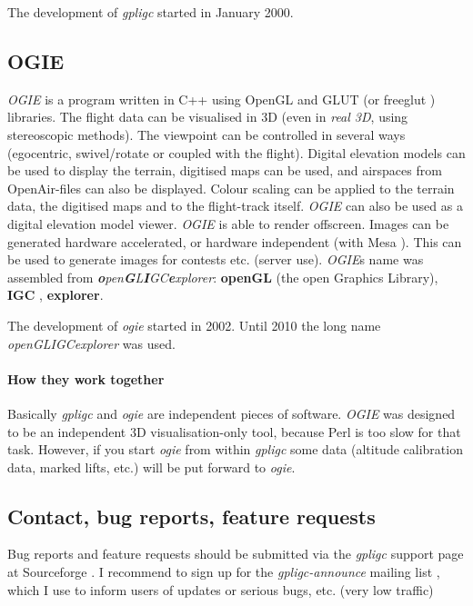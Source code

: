 The development of \emph{gpligc} started in January 2000.


\subsection{OGIE}
\emph{OGIE} is a  program written in C++ using OpenGL and GLUT (or freeglut \cite{freeglut}) libraries.
The flight data can be visualised in 3D (even in \emph{real 3D}, using stereoscopic methods).
The viewpoint can be controlled in several  ways (egocentric, swivel/rotate or coupled with the flight).
Digital elevation models can be used to display the terrain, digitised maps can be used, and airspaces from OpenAir\texttrademark-files can also be displayed.
Colour scaling can be applied to the terrain data, the digitised maps and to the flight-track itself.
\emph{OGIE} can also be used as a digital elevation model viewer.
\emph{OGIE} is able to render offscreen. Images can be generated hardware accelerated, or hardware independent (with Mesa \cite{mesa}). This can be used to generate images for contests etc. (server use).
\emph{OGIE}s name was assembled from \emph{\textbf{o}pen\textbf{G}L\textbf{I}GC\textbf{e}xplorer}: \textbf{openGL} (the open Graphics Library), \textbf{IGC} \cite{igc}, \textbf{explorer}.


The development of \emph{ogie} started in 2002. Until 2010 the long name \emph{openGLIGCexplorer} was used.


\paragraph{How they work together}
Basically \emph{gpligc} and \emph{ogie} are independent pieces of software.
\emph{OGIE} was designed to be an independent 3D visualisation-only tool, because Perl is too slow for that task.
However, if you start \emph{ogie} from within \emph{gpligc} some data (altitude calibration data, marked lifts, etc.) will be put forward to \emph{ogie}.

\subsection{Contact, bug reports, feature requests}
Bug reports and feature requests should be submitted via the \emph{gpligc} support page at Sourceforge \cite{gpligc}.
I recommend to sign up for the \emph{gpligc-announce} mailing list \cite{gpligc}, which I use to inform users of updates or serious bugs, etc. (very low traffic)
